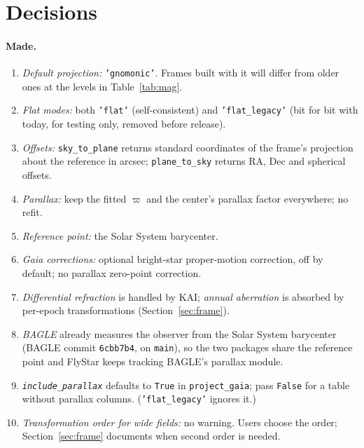 \documentclass[11pt]{article}
\newcommand{\code}[1]{\texttt{#1}}
\begin{document}
\section{Decisions}
\label{sec:decisions}

\paragraph{Made.}
\begin{enumerate}
  \item \emph{Default projection:} \code{'gnomonic'}. Frames built with it
    will differ from older ones at the levels in Table~\ref{tab:mag}.
  \item \emph{Flat modes:} both \code{'flat'} (self-consistent) and
    \code{'flat\_legacy'} (bit for bit with today, for testing only, removed
    before release).
  \item \emph{Offsets:} \code{sky\_to\_plane} returns standard coordinates of
    the frame's projection about the reference in arcsec;
    \code{plane\_to\_sky} returns RA, Dec and spherical offsets.
  \item \emph{Parallax:} keep the fitted $\varpi$ and the center's parallax
    factor everywhere; no refit.
  \item \emph{Reference point:} the Solar System barycenter.
  \item \emph{Gaia corrections:} optional bright-star proper-motion
    correction, off by default; no parallax zero-point correction.
  \item \emph{Differential refraction} is handled by KAI; \emph{annual
    aberration} is absorbed by per-epoch transformations
    (Section~\ref{sec:frame}).
  \item \emph{BAGLE} already measures the observer from the Solar System
    barycenter (BAGLE commit \code{6cbb7b4}, on \code{main}), so the two
    packages share the reference point and FlyStar keeps tracking BAGLE's
    parallax module.
  \item \emph{\code{include\_parallax}} defaults to \code{True} in
    \code{project\_gaia}; pass \code{False} for a table without parallax
    columns. (\code{'flat\_legacy'} ignores it.)
  \item \emph{Transformation order for wide fields:} no warning. Users choose
    the order; Section~\ref{sec:frame} documents when second order is needed.
\end{enumerate}
\end{document}
